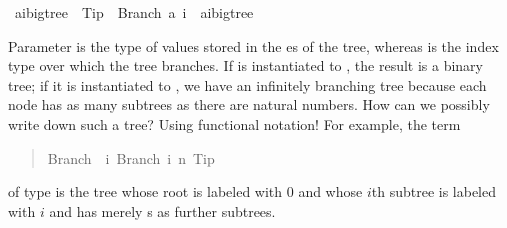 \begin{isabelle}%
\ {\isacharparenleft}{\isacharprime}a{\isacharcomma}{\isacharprime}i{\isacharparenright}bigtree\ {\isacharequal}\ Tip\ {\isacharbar}\ Branch\ {\isacharprime}a\ {\isachardoublequote}{\isacharprime}i\ {\isasymRightarrow}\ {\isacharparenleft}{\isacharprime}a{\isacharcomma}{\isacharprime}i{\isacharparenright}bigtree{\isachardoublequote}%
\begin{isamarkuptext}%
\noindent Parameter  is the type of values stored in
the es of the tree, whereas  is the index
type over which the tree branches. If  is instantiated to
, the result is a binary tree; if it is instantiated to
, we have an infinitely branching tree because each node
has as many subtrees as there are natural numbers. How can we possibly
write down such a tree? Using functional notation! For example, the term
\begin{quote}

\begin{isabelle}%
Branch\ \ {\isacharparenleft}{\isasymlambda}\mbox{i}{\isachardot}\ Branch\ \mbox{i}\ {\isacharparenleft}{\isasymlambda}\mbox{n}{\isachardot}\ Tip{\isacharparenright}{\isacharparenright}
\end{isabelle}%

\end{quote}
of type  is the tree whose
root is labeled with 0 and whose $i$th subtree is labeled with $i$ and
has merely s as further subtrees.


\end{isamarkuptext}
\end{isabelle}
